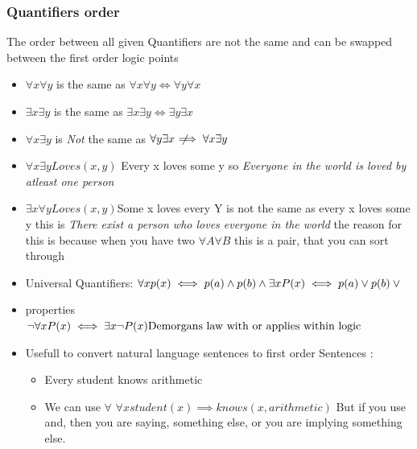 \documentclass{article}
\theoremstyle{mytheoremstyle}
\theoremstyle{mytheoremstyle}
\theoremstyle{myproblemstyle}
\begin{document}
\subsubsection{Quantifiers order}
The order between all given Quantifiers are not the same and can be swapped between the first order logic points
\begin{itemize}
	\item \( \forall x \forall y  \) is the same as \( \forall x \forall y \iff \forall y \forall x \)
	\item \( \exists x \exists y \)  is the same as \( \exists x \exists y \iff \exists y \exists x \)
	\item \( \forall x \exists y  \) is \textit{Not} the same as \( \forall y \exists x \;\not\!\!\!\implies \forall x \exists y\)
	\item \( \forall x \exists y Loves(x,y)\) Every x loves some y so \textit{Everyone in the world is loved by atleast one person }
	\item \( \exists x \forall y Loves(x,y) \)Some x loves every Y is not the same as every x loves some y this is \textit{There exist a person who loves everyone in the world} the reason for this is because when you have two \( \forall A \forall  B \) this is a pair, that you can sort through
\end{itemize}

\begin{itemize}
	\item Universal Quantifiers:
	      \begin{math}
		      \forall x p(x) \iff p(a) \land p(b) \land \\
		      \exists x P(x) \iff p(a) \lor p(b) \lor \\
	      \end{math}
	\item properties
	      \begin{math}
		      \neg \forall x P(x) \iff \exists x \neg P(x)\\
		      \text{Demorgans law with or applies within logic}
	      \end{math}
	\item Usefull to convert natural language sentences to  first order Sentences :
	      \begin{itemize}
		      \item Every student knows arithmetic
		      \item We can use \( \forall  \) \( \forall x student(x) \implies knows(x, arithmetic) \) But if you use and, then you are saying, something else, or you are implying something else.
	      \end{itemize}

\end{itemize}
\end{document}

